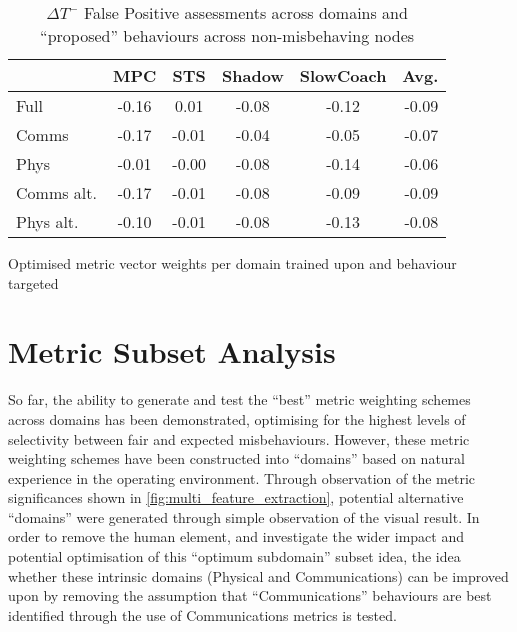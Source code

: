 \begin{table}
	\centering
	\caption{$\Delta T^-$ False Positive assessments across domains and ``proposed'' behaviours across non-misbehaving nodes}
	\begin{tabular}{|l|*{4}{c}|r|}
		\toprule
		\diagbox{Domain}{Behaviour} &   MPC &   STS &  Shadow &  SlowCoach &  Avg. \\
		\midrule
		Full       & -0.16 &  0.01 &   -0.08 &      -0.12 & -0.09 \\
		Comms      & -0.17 & -0.01 &   -0.04 &      -0.05 & -0.07 \\
		Phys       & -0.01 & -0.00 &   -0.08 &      -0.14 & -0.06 \\
		Comms alt. & -0.17 & -0.01 &   -0.08 &      -0.09 & -0.09 \\
		Phys alt.  & -0.10 & -0.01 &   -0.08 &      -0.13 & -0.08 \\
		\bottomrule
	\end{tabular}
	
	\label{tab:domain_deltas_minus}
\end{table}

\begin{landscape}
  \begin{table}
    \centering
    \caption{Optimised metric vector weights per domain trained upon and behaviour targeted}
    
    \label{tab:optimised_weights}
  \end{table}
\end{landscape}

\section{Metric Subset Analysis}
So far, the ability to generate and test the ``best'' metric weighting schemes across domains has been demonstrated, optimising for the highest levels of selectivity between fair and expected misbehaviours. 
However, these metric weighting schemes have been constructed into ``domains'' based on natural experience in the operating environment. 
Through observation of the metric significances shown in \autoref{fig:multi_feature_extraction}, potential alternative ``domains'' were generated through simple observation of the visual result.
In order to remove the human element, and investigate the wider impact and potential optimisation of this ``optimum subdomain'' subset idea, the idea whether these intrinsic  domains (Physical and Communications) can be improved upon by removing the assumption that ``Communications'' behaviours are best identified through the use of Communications metrics is tested.

